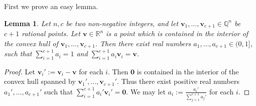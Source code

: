 \documentclass[11pt]{amsart}
\numberwithin{equation}{section}
\newtheorem{lem}[thm]{Lemma}
\theoremstyle{definition}
\theoremstyle{definition}
\theoremstyle{definition}
\begin{document}
First we prove an easy lemma.


\begin{lem}\label{lem: from polytope to perturbation}
Let $n,c$ be two non-negative integers, and let $\bm{v}_1,\dots,\bm{v}_{c+1}\in\mathbb Q^n$ be $c+1$ rational points. Let $\bm{v}\in\mathbb R^n$ is a point which is contained in the interior of the convex hull of $\bm{v}_1,\dots,\bm{v}_{c+1}$. Then there exist real numbers $a_1,\dots,a_{c+1}\in (0,1]$, such that $\sum_{i=1}^{c+1}a_i=1$ and $\sum_{i=1}^{c+1}a_i\bm{v}_i=\bm{v}$.
\end{lem}
\begin{proof}
Let $\bm{v}_i':=\bm{v}_i-\bm{v}$ for each $i$. Then $\bm{0}$ is contained in the interior of the convex hull spanned by $\bm{v}_1',\dots,\bm{v}_{c+1}'$. Thus there exist positive real numbers $a_1',\dots,a_{c+1}'$ such that $\sum_{i=1}^{c+1}a_i'\bm{v}_i'=\bm{0}$. We may let $a_i:=\frac{a_i'}{\sum_{j=1}^{c+1}a_j'}$ for each $i$. 
\end{proof}
\end{document}
